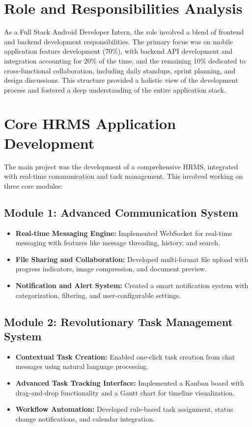 \section{Role and Responsibilities Analysis}
As a Full Stack Android Developer Intern, the role involved a blend of frontend and backend development responsibilities. The primary focus was on mobile application feature development (70\%), with backend API development and integration accounting for 20\% of the time, and the remaining 10\% dedicated to cross-functional collaboration, including daily standups, sprint planning, and design discussions. This structure provided a holistic view of the development process and fostered a deep understanding of the entire application stack.

\section{Core HRMS Application Development}
The main project was the development of a comprehensive HRMS, integrated with real-time communication and task management. This involved working on three core modules:

\subsection{Module 1: Advanced Communication System}
\begin{itemize}
    \item \textbf{Real-time Messaging Engine:} Implemented WebSocket for real-time messaging with features like message threading, history, and search.
    \item \textbf{File Sharing and Collaboration:} Developed multi-format file upload with progress indicators, image compression, and document preview.
    \item \textbf{Notification and Alert System:} Created a smart notification system with categorization, filtering, and user-configurable settings.
\end{itemize}

\subsection{Module 2: Revolutionary Task Management System}
\begin{itemize}
    \item \textbf{Contextual Task Creation:} Enabled one-click task creation from chat messages using natural language processing.
    \item \textbf{Advanced Task Tracking Interface:} Implemented a Kanban board with drag-and-drop functionality and a Gantt chart for timeline visualization.
    \item \textbf{Workflow Automation:} Developed rule-based task assignment, status change notifications, and calendar integration.
\end{itemize}


